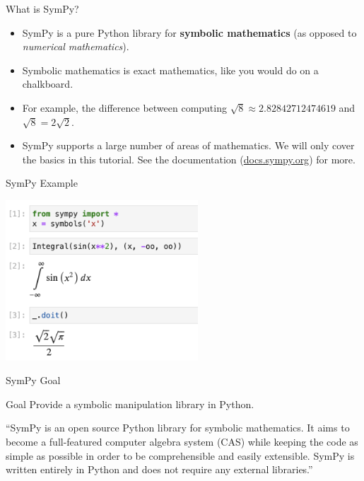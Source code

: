 \documentclass[xcolor=svgnames]{beamer}
\begin{document}
\begin{frame}
  \begin{block}{What is SymPy?}
\begin{itemize}
    \item SymPy is a pure Python library for \textbf{symbolic mathematics} (as
      opposed to \textit{numerical mathematics}).
\item Symbolic mathematics is exact mathematics, like you would do on a chalkboard.
      \item For example, the difference between computing $\sqrt{8}\approx
        2.82842712474619$ and $\sqrt{8}=2\sqrt{2}$.
\item SymPy supports a large number of areas of mathematics. We will only
  cover the basics in this tutorial. See the documentation (\href{https://docs.sympy.org/latest/index.html}{docs.sympy.org})
  for more.
\end{itemize}
    \end{block}
\end{frame}

\begin{frame}{SymPy Example}
  \begin{block}{}
    \includegraphics[height=6cm]{example.png}
  \end{block}
\end{frame}

\begin{frame}{SymPy Goal}
  \begin{block}{Goal}
    Provide a symbolic manipulation library in Python.
  \end{block}
  \begin{block}

    ``SymPy is an open source Python library for symbolic mathematics. It aims to
    become a full-featured computer algebra system (CAS) while keeping the code as
    simple as possible in order to be comprehensible and easily extensible. SymPy
    is written entirely in Python and does not require any external libraries.''

  \end{block}
\end{frame}
\end{document}
